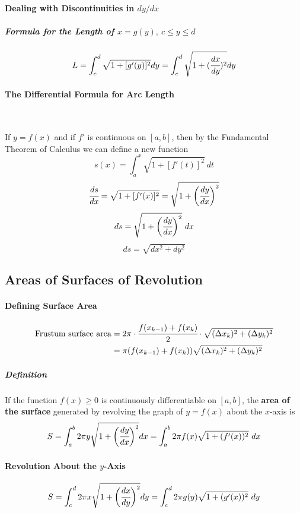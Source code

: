 \documentclass{article}
\begin{document}
            \paragraph{Dealing with Discontinuities in $dy/dx$}
                \subparagraph{Formula for the Length of $x=g(y),\ c\le y \le d$}
                \[L=\int_c^d \sqrt{1+[g'(y)]^2}dy=\int_c^d \sqrt{1+(\cfrac{dx}{dy})^2}dy\]
            \paragraph{The Differential Formula for Arc Length}
                \text{}\\
                \par If $y=f(x)$ and if $f'$ is continuous on $[a,b]$, then by the Fundamental Theorem of Calculus we can define a new function
                \[s(x)=\int_a^x \sqrt{1+[f'(t)]^2}\ dt\]
                \[\cfrac{ds}{dx}=\sqrt{1+[f'(x)]^2}=\sqrt{1+\bigg (\cfrac{dy}{dx}\bigg )^2}\]
                \[ds=\sqrt{1+\bigg(\cfrac{dy}{dx}\bigg)^2}\ dx\]
                \[ds=\sqrt{dx^2+dy^2}\]
        \subsection{Areas of Surfaces of Revolution}
            \paragraph{Defining Surface Area}
            \begin{equation}
                \begin{aligned}
                    \text{Frustum surface area}&=2\pi \cdot \cfrac{f(x_{k-1})+f(x_k)}{2}\cdot \sqrt{(\Delta x_k)^2+(\Delta y_k)^2}\\
                    &=\pi (f(x_{k-1})+f(x_k))\sqrt{(\Delta x_k)^2+(\Delta y_k)^2}
                \end{aligned}
            \end{equation}
                \subparagraph{Definition} If the function $f(x)\ge 0$ is continuously differentiable on $[a,b]$, the \textbf{area of the surface} generated by revolving the graph of $y=f(x)$ about the $x$-axis is  
                \[S=\int_a^b 2\pi y\sqrt{1+\bigg( \cfrac{dy}{dx} \bigg)^2} dx=\int_a^b 2\pi f(x) \sqrt{1+(f'(x))^2}\ dx\]
            \paragraph{Revolution About the $y$-Axis}
                \[S=\int_c^d 2\pi x\sqrt{1+\bigg( \cfrac{dx}{dy} \bigg)^2} dy=\int_c^d 2\pi g(y) \sqrt{1+(g'(x))^2}\ dy\]
\end{document}
